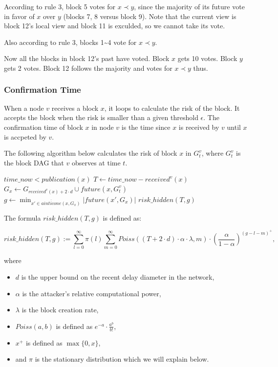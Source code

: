 \documentclass[a4paper,11pt]{article}
\begin{document}
According to rule 3, block 5 votes for $x \prec y$, since the majority of its
future vote in favor of $x$ over $y$ (blocks 7, 8 versus block 9). Note that the
current view is block 12's local view and block 11 is exculded, so we cannot
take its vote.

Also according to rule 3, blocks 1\textasciitilde4 vote for $x \prec y$.

Now all the blocks in block 12's past have voted. Block $x$ gets 10 votes. Block
$y$ gets 2 votes. Block 12 follows the majority and votes for $x \prec y$ thus.


\subsubsection*{Confirmation Time}

When a node $v$ receives a block $x$, it loops to calculate the  risk of
the block. It accepts the block when the risk is smaller than a given threshold
$\epsilon$. The confirmation time of block $x$ in node $v$ is the time
since $x$ is received by $v$ until $x$ is accpeted by $v$.

The following algorithm below calculates the  risk of block $x$ in
$G_t^v$, where $G_t^v$ is the block DAG that $v$ observes at time $t$.

\begin{codebox}
\li \If $time\_now < publication(x)$
\li   \Then
      \End
\li $T \gets time\_now - received^v(x)$
\li $G_x \gets G_{received^v(x) + 2 \cdot d} \cup future(x, G_t^v)$
\li $g \gets \min_{x' \in \overline{ainticone}(x,G_x)} |future(x',G_x)|$
\li \Return $risk\_hidden(T,g)$
\end{codebox}

The formula $risk\_hidden(T,g)$ is defined as:

$$
risk\_hidden(T,g) := \sum_{l=0}^{\infty} \pi(l) \sum_{m=0}^{\infty} Poiss((T + 2
\cdot d) \cdot \alpha \cdot \lambda, m) \cdot \left(\frac{\alpha}{1 -
\alpha}\right)^{(g - l - m)^+},
$$

where

\begin{itemize}
	\item $d$ is the upper bound on the recent delay diameter in the network,
	\item $\alpha$ is the attacker’s relative computational power,
	\item $\lambda$ is the block creation rate,
	\item $Poiss(a, b)$ is defined as $e^{-a} \cdot \frac{a^b}{b!}$,
	\item $x^+$ is defined as $\max\{0, x\}$,
	\item and $\pi$ is the stationary distribution which we will explain below.
\end{itemize}
\end{document}
